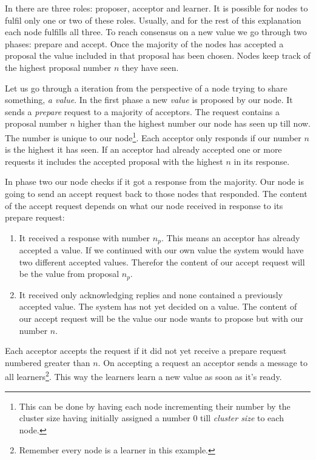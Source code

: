 In \paxos{} there are three roles: proposer, acceptor and learner. It is possible for nodes to fulfil only one or two of these roles. Usually, and for the rest of this explanation each node fulfills all three. To reach consensus on a new value we go through two phases: prepare and accept. Once the majority of the nodes has accepted a proposal the value included in that proposal has been chosen. Nodes keep track of the highest proposal number $n$ they have seen. 

Let us go through a \paxos{} iteration from the perspective of a node trying to share something, \textit{a value}. In the first phase a new \textit{value} is proposed by our node. It sends a \textit{prepare} request to a majority of acceptors. The request contains a proposal number $n$ higher than the highest number our node has seen up till now. The number is unique to our node\footnote{This can be done by having each node incrementing their number by the cluster size having initially assigned a number $0$ till \textit{cluster size} to each node.}. Each acceptor only responds if our number $n$ is the highest it has seen. If an acceptor had already accepted one or more requests it includes the accepted proposal with the highest $n$ in its response.

In phase two our node checks if it got a response from the majority. Our node is going to send an accept request back to those nodes that responded. The content of the accept request depends on what our node received in response to its prepare request:
%
\begin{enumerate}
	\item It received a response with number $n_p$. This means an acceptor has already accepted a value. If we continued with our own value the system would have two different accepted values. Therefor the content of our accept request will be the value from proposal $n_p$.
	\item It received only acknowledging replies and none contained a previously accepted value. The system has not yet decided on a value. The content of our accept request will be the value our node wants to propose but with our number $n$.
\end{enumerate}
%
Each acceptor accepts the request if it did not yet receive a prepare request numbered greater than $n$. On accepting a request an acceptor sends a message to all learners\footnote{Remember every node is a learner in this example.}. This way the learners learn a new value as soon as it's ready.

